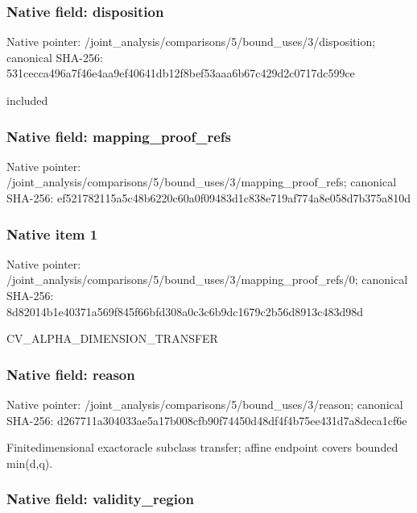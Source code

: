 \documentclass[10pt,a4paper]{article}
\begin{document}
\subsubsection{Native field: disposition}


Native pointer: /joint\_analysis/comparis\allowbreak{}ons/5/bound\_uses/3/dispo\allowbreak{}sition; canonical SHA-256: 531cecca496a7f46e4aa9ef4\allowbreak{}0641db12f8bef53aaa6b67c4\allowbreak{}29d2c0717dc599ce


included


\subsubsection{Native field: mapping\_proof\_refs}


Native pointer: /joint\_analysis/comparis\allowbreak{}ons/5/bound\_uses/3/mappi\allowbreak{}ng\_proof\_refs; canonical SHA-256: ef521782115a5c48b6220c60\allowbreak{}a0f09483d1c838e719af774a\allowbreak{}8e058d7b375a810d



\subsubsection{Native item 1}


Native pointer: /joint\_analysis/comparis\allowbreak{}ons/5/bound\_uses/3/mappi\allowbreak{}ng\_proof\_refs/0; canonical SHA-256: 8d82014b1e40371a569f845f\allowbreak{}66bfd308a0c3c6b9dc1679c2\allowbreak{}b56d8913c483d98d


CV\_ALPHA\_DIMENSION\_TRANSFER


\subsubsection{Native field: reason}


Native pointer: /joint\_analysis/comparis\allowbreak{}ons/5/bound\_uses/3/reaso\allowbreak{}n; canonical SHA-256: d267711a304033ae5a17b008\allowbreak{}cfb90f74450d48df4f4b75ee\allowbreak{}431d7a8deca1cf6e


Finitedimensional exactoracle subclass transfer; affine endpoint covers bounded min(d,q).


\subsubsection{Native field: validity\_region}
\end{document}
